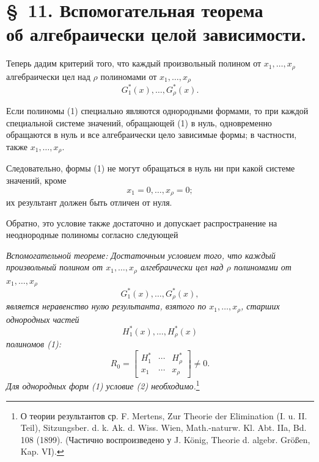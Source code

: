 \documentclass[11pt]{article}
\begin{document}
\section*{\S\ 11. Вспомогательная теорема\\ об алгебраически целой зависимости.}

Теперь дадим критерий того, что каждый произвольный полином от $x_1,\ldots,x_\rho$ алгебраически цел над $\rho$ полиномами от $x_1,\ldots,x_\rho$
\begin{equation}
  G_1^*(x),\ldots,G_\rho^*(x).
\tag{1}
\end{equation}

Если полиномы (1) специально являются однородными формами, то при каждой специальной системе значений, обращающей (1) в нуль, одновременно обращаются в нуль и все алгебраически цело зависимые формы; в частности, также $x_1,\ldots,x_\rho$.

Следовательно, формы (1) не могут обращаться в нуль ни при какой системе значений, кроме
\[
  x_1=0,\ldots,x_\rho=0;
\]
их результант должен быть отличен от нуля.

Обратно, это условие также достаточно и допускает распространение на неоднородные полиномы согласно следующей

\emph{Вспомогательной теореме: Достаточным условием того, что каждый произвольный полином от $x_1,\ldots,x_\rho$ алгебраически цел над $\rho$ полиномами от $x_1,\ldots,x_\rho$}
\[
  G_1^*(x),\ldots,G_\rho^*(x),
\]
\emph{является неравенство нулю результанта, взятого по $x_1,\ldots,x_\rho$, старших однородных частей}
\[
  H_1^*(x),\ldots,H_\rho^*(x)
\]
\emph{полиномов (1):}
\begin{equation}
  R_0=\left[
  \begin{array}{ccc}
    H_1^*&\cdots&H_\rho^*\\
    x_1&\cdots&x_\rho
  \end{array}
  \right]\ne0.
\tag{2}
\end{equation}
\emph{Для однородных форм (1) условие (2) необходимо.}\footnote{О теории результантов ср. F. Mertens, Zur Theorie der Elimination (I. u. II. Teil), Sitzungsber. d. k. Ak. d. Wiss. Wien, Math.-naturw. Kl. Abt. IIa, Bd. 108 (1899). (Частично воспроизведено у J. König, Theorie d. algebr. Größen, Kap. VI).}
\end{document}
